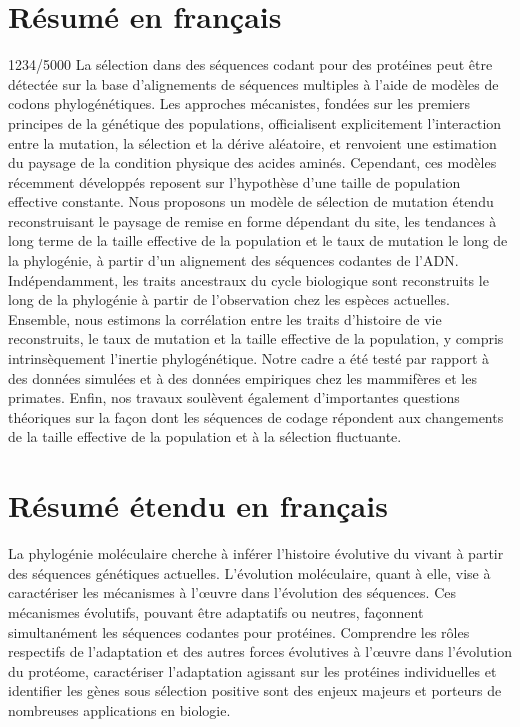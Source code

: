 \thispagestyle{empty}

\section*{Résumé en français}


1234/5000
La sélection dans des séquences codant pour des protéines peut être détectée sur la base d'alignements de séquences multiples à l'aide de modèles de codons phylogénétiques.
Les approches mécanistes, fondées sur les premiers principes de la génétique des populations, officialisent explicitement l'interaction entre la mutation, la sélection et la dérive aléatoire, et renvoient une estimation du paysage de la condition physique des acides aminés.
Cependant, ces modèles récemment développés reposent sur l'hypothèse d'une taille de population effective constante.
Nous proposons un modèle de sélection de mutation étendu reconstruisant le paysage de remise en forme dépendant du site, les tendances à long terme de la taille effective de la population et le taux de mutation le long de la phylogénie, à partir d'un alignement des séquences codantes de l'ADN.
Indépendamment, les traits ancestraux du cycle biologique sont reconstruits le long de la phylogénie à partir de l'observation chez les espèces actuelles.
Ensemble, nous estimons la corrélation entre les traits d'histoire de vie reconstruits, le taux de mutation et la taille effective de la population, y compris intrinsèquement l'inertie phylogénétique.
Notre cadre a été testé par rapport à des données simulées et à des données empiriques chez les mammifères et les primates.
Enfin, nos travaux soulèvent également d'importantes questions théoriques sur la façon dont les séquences de codage répondent aux changements de la taille effective de la population et à la sélection fluctuante.

\section*{Résumé étendu en français}

La phylogénie moléculaire cherche à inférer l’histoire évolutive du vivant à partir des séquences génétiques actuelles.
L'évolution moléculaire, quant à elle, vise à caractériser les mécanismes à l’œuvre dans l'évolution des séquences.
Ces mécanismes évolutifs, pouvant être adaptatifs ou neutres, façonnent simultanément les séquences codantes pour protéines.
Comprendre les rôles respectifs de l'adaptation et des autres forces évolutives à l’œuvre dans l'évolution du protéome, caractériser l'adaptation agissant sur les protéines individuelles et identifier les gènes sous sélection positive sont des enjeux majeurs et porteurs de nombreuses applications en biologie. \\

